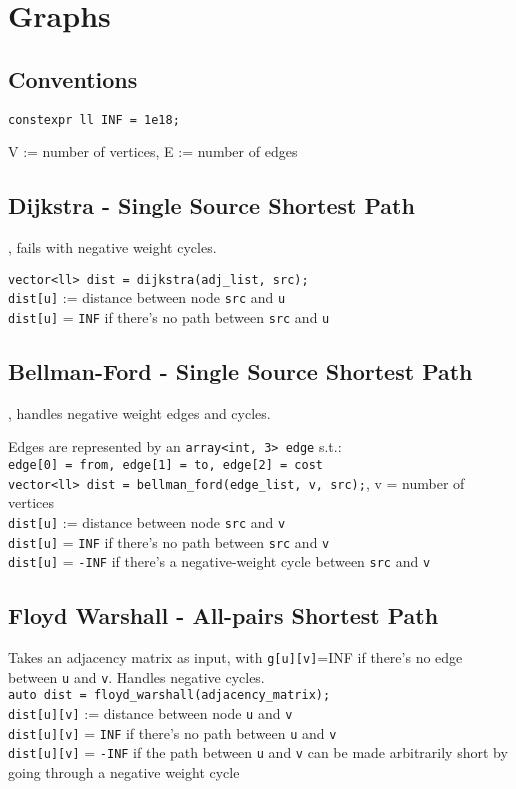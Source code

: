 \section{Graphs}

\subsection{Conventions}
\begin{lstlisting}
constexpr ll INF = 1e18;
\end{lstlisting}
V := number of vertices, E := number of edges

\subsection{Dijkstra - Single Source Shortest Path}
 , fails with negative weight cycles.

\verb|vector<ll> dist = dijkstra(adj_list, src);| \\
\verb|dist[u]| := distance between node \verb|src| and \verb|u| \\
\verb|dist[u]| = \verb|INF| if there's no path between \verb|src| and \verb|u|


\subsection{Bellman-Ford - Single Source Shortest Path}
, handles negative weight edges and cycles.

Edges are represented by an \verb|array<int, 3> edge| s.t.: \\
\verb|edge[0] = from, edge[1] = to, edge[2] = cost| \\
\verb|vector<ll> dist = bellman_ford(edge_list, v, src);|, v = number of vertices \\
\verb|dist[u]| := distance between node \verb|src| and \verb|v| \\
\verb|dist[u]| = \verb|INF| if there's no path between \verb|src| and \verb|v| \\
\verb|dist[u]| = \verb|-INF| if there's a negative-weight cycle between \verb|src| and \verb|v|


\subsection{Floyd Warshall - All-pairs Shortest Path}

Takes an adjacency matrix as input, with \verb|g[u][v]|=INF if there's no edge between \verb|u| and \verb|v|. Handles negative cycles. \\
\verb|auto dist = floyd_warshall(adjacency_matrix);| \\
\verb|dist[u][v]| := distance between node \verb|u| and \verb|v| \\
\verb|dist[u][v]| = \verb|INF| if there's no path between \verb|u| and \verb|v| \\
\verb|dist[u][v]| = \verb|-INF| if the path between \verb|u| and \verb|v| can be made arbitrarily short by going through a negative weight cycle

